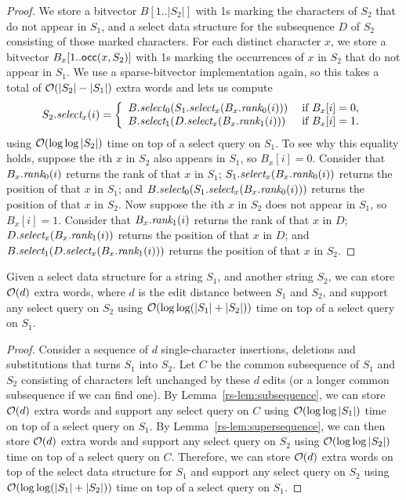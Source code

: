 \begin{proof}
We store a bitvector \(B [1..|S_2|]\) with 1s marking the characters of $S_2$ that do not appear in $S_1$, and a select data structure for the subsequence $D$ of $S_2$ consisting of those marked characters.  For each distinct character $x$, we store a bitvector \(B_x [1..\mathsf{occ} (x, S_2)]\) with 1s marking the occurrences of $x$ in $S_2$ that do not appear in $S_1$.  We use a sparse-bitvector implementation again, so this takes a total of $\mathcal{O}\!\left( |S_2| - |S_1| \right)$ extra words and lets us compute
\[S_2.\select_x (i) =
\left\{ \begin{array}{l@{\hspace{3ex}}l}
B.\select_0 (S_1.\select_x (B_x.\rank_0 (i))) & \mbox{if \(B_x [i] = 0\),}\\
B.\select_1 (D.\select_x (B_x.\rank_1 (i))) & \mbox{if \(B_x [i] = 1\).}
\end{array} \right.\]
using $\mathcal{O}\!\left( \log \log |S_2| \right)$ time on top of a select query on $S_1$.  To see why this equality holds, suppose the $i$th $x$ in $S_2$ also appears in $S_1$, so \(B_x [i] = 0\).  Consider that \(B_x.\textit{rank}_0 (i)\) returns the rank of that $x$ in $S_1$; \(S_1.\textit{select}_x (B_x.\textit{rank}_0 (i))\) returns the position of that $x$ in $S_1$; and \(B.\textit{select}_0 (S_1.\textit{select}_x (B_x.\textit{rank}_0 (i)))\) returns the position of that $x$ in $S_2$.  Now suppose the $i$th $x$ in $S_2$ does not appear in $S_1$, so \(B_x [i] = 1\).  Consider that \(B_x.\textit{rank}_1 (i)\) returns the rank of that $x$ in $D$; \(D.\textit{select}_x (B_x.\textit{rank}_1 (i))\) returns the position of that $x$ in $D$; and \(B.\textit{select}_1 (D.\textit{select}_x (B_x.\textit{rank}_1 (i)))\) returns the position of that $x$ in $S_2$.
\end{proof}

\begin{theorem}
\label{rs-thm:main}
Given a select data structure for a string $S_1$, and another string $S_2$, we can store $\mathcal{O}\!\left( d \right)$ extra words, where $d$ is the edit distance between $S_1$ and $S_2$, and support any select query on $S_2$ using $\mathcal{O}\!\left( \log \log (|S_1| + |S_2|) \right)$ time on top of a select query on $S_1$.
\end{theorem}

\begin{proof}
Consider a sequence of $d$ single-character insertions, deletions and substitutions that turns $S_1$ into $S_2$.  Let $C$ be the common subsequence of $S_1$ and $S_2$ consisting of characters left unchanged by these $d$ edits (or a longer common subsequence if we can find one).  By Lemma~\ref{rs-lem:subsequence}, we can store $\mathcal{O}\!\left( d \right)$ extra words and support any select query on $C$ using $\mathcal{O}\!\left( \log \log |S_1| \right)$ time on top of a select query on $S_1$.  By Lemma~\ref{rs-lem:supersequence}, we can then store $\mathcal{O}\!\left( d \right)$ extra words and support any select query on $S_2$ using $\mathcal{O}\!\left( \log \log |S_2| \right)$ time on top of a select query on $C$.  Therefore, we can store $\mathcal{O}\!\left( d \right)$ extra words on top of the select data structure for $S_1$ and support any select query on $S_2$ using $\mathcal{O}\!\left( \log \log (|S_1| + |S_2|) \right)$ time on top of a select query on $S_1$.
\end{proof}

